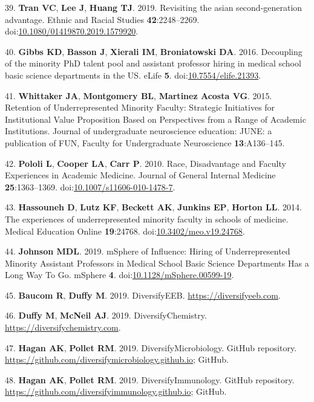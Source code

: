 \documentclass[10pt,]{article}
\begin{document}
\hypertarget{ref-Tran2019}{}
39. \textbf{Tran VC}, \textbf{Lee J}, \textbf{Huang TJ}. 2019.
Revisiting the asian second-generation advantage. Ethnic and Racial
Studies \textbf{42}:2248--2269.
doi:\href{https://doi.org/10.1080/01419870.2019.1579920}{10.1080/01419870.2019.1579920}.

\hypertarget{ref-Gibbs2016}{}
40. \textbf{Gibbs KD}, \textbf{Basson J}, \textbf{Xierali IM},
\textbf{Broniatowski DA}. 2016. Decoupling of the minority PhD talent
pool and assistant professor hiring in medical school basic science
departments in the US. eLife \textbf{5}.
doi:\href{https://doi.org/10.7554/elife.21393}{10.7554/elife.21393}.

\hypertarget{ref-whittaker_retention_2015}{}
41. \textbf{Whittaker JA}, \textbf{Montgomery BL}, \textbf{Martinez
Acosta VG}. 2015. Retention of Underrepresented Minority Faculty:
Strategic Initiatives for Institutional Value Proposition Based on
Perspectives from a Range of Academic Institutions. Journal of
undergraduate neuroscience education: JUNE: a publication of FUN,
Faculty for Undergraduate Neuroscience \textbf{13}:A136--145.

\hypertarget{ref-pololi_race_2010}{}
42. \textbf{Pololi L}, \textbf{Cooper LA}, \textbf{Carr P}. 2010. Race,
Disadvantage and Faculty Experiences in Academic Medicine. Journal of
General Internal Medicine \textbf{25}:1363--1369.
doi:\href{https://doi.org/10.1007/s11606-010-1478-7}{10.1007/s11606-010-1478-7}.

\hypertarget{ref-hassouneh_experiences_2014}{}
43. \textbf{Hassouneh D}, \textbf{Lutz KF}, \textbf{Beckett AK},
\textbf{Junkins EP}, \textbf{Horton LL}. 2014. The experiences of
underrepresented minority faculty in schools of medicine. Medical
Education Online \textbf{19}:24768.
doi:\href{https://doi.org/10.3402/meo.v19.24768}{10.3402/meo.v19.24768}.

\hypertarget{ref-johnson_msphere_2019}{}
44. \textbf{Johnson MDL}. 2019. mSphere of Influence: Hiring of
Underrepresented Minority Assistant Professors in Medical School Basic
Science Departments Has a Long Way To Go. mSphere \textbf{4}.
doi:\href{https://doi.org/10.1128/mSphere.00599-19}{10.1128/mSphere.00599-19}.

\hypertarget{ref-Baucom_2019}{}
45. \textbf{Baucom R}, \textbf{Duffy M}. 2019. DiversifyEEB.
\url{https://diversifyeeb.com}.

\hypertarget{ref-Duffy_2019}{}
46. \textbf{Duffy M}, \textbf{McNeil AJ}. 2019. DiversifyChemistry.
\url{https://diversifychemistry.com}.

\hypertarget{ref-Hagan2019_micro}{}
47. \textbf{Hagan AK}, \textbf{Pollet RM}. 2019. DiversifyMicrobiology.
GitHub repository.
\url{https://github.com/diversifymicrobiology.github.io}; GitHub.

\hypertarget{ref-Hagan2019_immuno}{}
48. \textbf{Hagan AK}, \textbf{Pollet RM}. 2019. DiversifyImmunology.
GitHub repository.
\url{https://github.com/diversifyimmunology.github.io}; GitHub.
\end{document}
